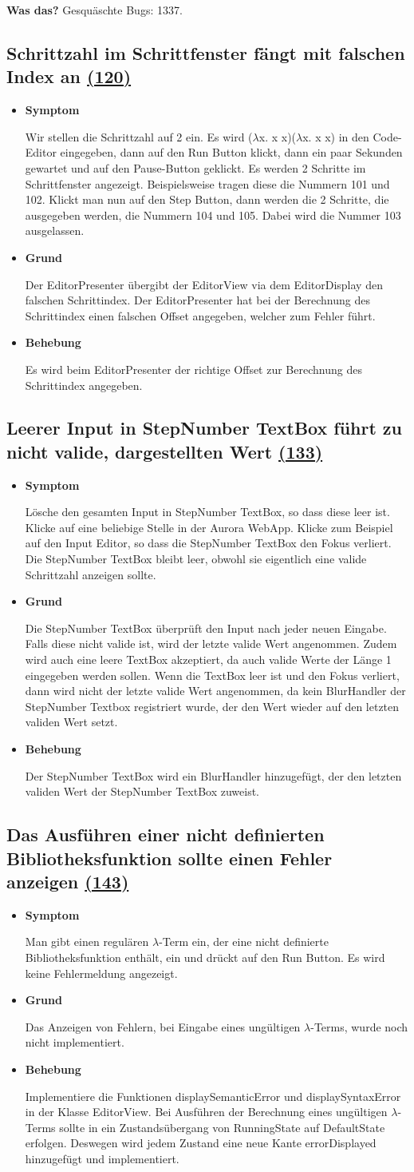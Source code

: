 \documentclass[parskip=full,11pt,twoside]{scrartcl}
\newcommand{\issueref}[1]{
    \href{https://git.scc.kit.edu/ap/Aurora/issues/#1}{(#1)}
}
\newcommand{\regrtest}[5]{
    \subsection{#1 \issueref{#2}}
    \begin{itemize}
        \item \textbf{Symptom}
            #3
        \item \textbf{Grund}
            #4
        \item \textbf{Behebung}
            #5
    \end{itemize}
}
\begin{document}
    \textbf{Was das?}
    Gesquäschte Bugs: 1337.

    \regrtest{Schrittzahl im Schrittfenster fängt mit falschen Index an}{120}{
        Wir stellen die Schrittzahl auf 2 ein.
        Es wird ($\lambda$x. x x)($\lambda$x. x x) in den Code-Editor eingegeben,
            dann auf den Run Button klickt, dann ein paar Sekunden gewartet und auf den Pause-Button geklickt.
        Es werden 2 Schritte im Schrittfenster angezeigt.
        Beispielsweise tragen diese die Nummern 101 und 102.
        Klickt man nun auf den Step Button, dann werden die 2 Schritte, die ausgegeben werden, die Nummern 104 und 105.
        Dabei wird die Nummer 103 ausgelassen.
    }{
        Der EditorPresenter übergibt der EditorView via dem EditorDisplay den falschen Schrittindex.
        Der EditorPresenter hat bei der Berechnung des Schrittindex einen falschen Offset angegeben, welcher zum Fehler führt.
    }{
        Es wird beim EditorPresenter der richtige Offset zur Berechnung des Schrittindex angegeben.
    }

    \regrtest{Leerer Input in StepNumber TextBox führt zu nicht valide, dargestellten Wert}{133}{
        Lösche den gesamten Input in StepNumber TextBox, so dass diese leer ist. Klicke auf eine beliebige Stelle in der Aurora WebApp.
        Klicke zum Beispiel auf den Input Editor, so dass die StepNumber TextBox den Fokus verliert.
        Die StepNumber TextBox bleibt leer, obwohl sie eigentlich eine valide Schrittzahl anzeigen sollte.
    }{
        Die StepNumber TextBox überprüft den Input nach jeder neuen Eingabe.
        Falls diese nicht valide ist, wird der letzte valide Wert angenommen.
        Zudem wird auch eine leere TextBox akzeptiert, da auch valide Werte der Länge 1 eingegeben werden sollen.
        Wenn die TextBox leer ist und den Fokus verliert, dann wird nicht der letzte valide Wert angenommen, da kein BlurHandler der StepNumber Textbox registriert wurde,
            der den Wert wieder auf den letzten validen Wert setzt.
    }{
        Der StepNumber TextBox wird ein BlurHandler hinzugefügt, der den letzten validen Wert der StepNumber TextBox zuweist.
    }

    \regrtest{Das Ausführen einer nicht definierten Bibliotheksfunktion sollte einen Fehler anzeigen}{143}{
        Man gibt einen regulären $\lambda$-Term ein, der eine nicht definierte Bibliotheksfunktion enthält, ein und drückt auf den Run Button.
        Es wird keine Fehlermeldung angezeigt.
    }{
        Das Anzeigen von Fehlern, bei Eingabe eines ungültigen $\lambda$-Terms, wurde noch nicht implementiert.
    }{
        Implementiere die Funktionen displaySemanticError und displaySyntaxError in der Klasse EditorView.
        Bei Ausführen der Berechnung eines ungültigen $\lambda$-Terms sollte in ein Zustandsübergang von RunningState auf DefaultState erfolgen.
        Deswegen wird jedem Zustand eine neue Kante errorDisplayed hinzugefügt und implementiert.
    }
\end{document}

